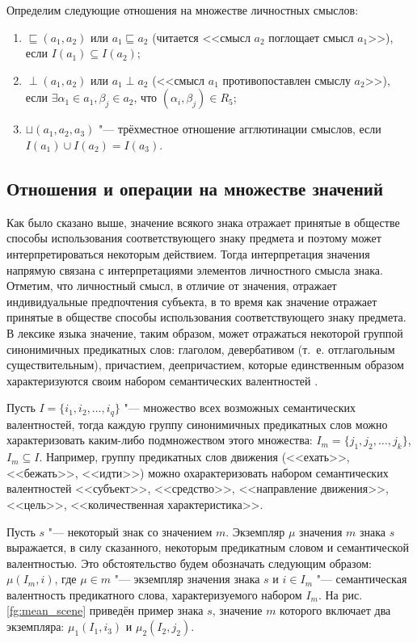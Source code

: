 Определим следующие отношения на множестве личностных смыслов:
\begin{enumerate}
	\item $\sqsubseteq(a_1,a_2)$ или $a_1\sqsubseteq a_2$ (читается <<смысл $a_2$ поглощает смысл $a_1$>>), если $I(a_1)\subseteq I(a_2)$;
	\item $\perp(a_1,a_2)$  или $a_1\perp a_2$ (<<смысл $a_1$ противопоставлен смыслу $a_2$>>), если $\exists\alpha_1\in a_1,\beta_j\in a_2$, что $(\alpha_i,\beta_j)\in R_5$;
	\item $\sqcup(a_1,a_2,a_3)$ "--- трёхместное отношение агглютинации смыслов, если $I(a_1)\cup I(a_2)=I(a_3)$.
\end{enumerate}

\subsection{Отношения и операции на множестве значений}

Как было сказано выше, значение всякого знака отражает принятые в обществе способы использования соответствующего знаку предмета и поэтому может интерпретироваться некоторым действием. Тогда интерпретация значения напрямую связана с интерпретациями элементов личностного смысла знака. Отметим, что личностный смысл, в отличие от значения, отражает индивидуальные предпочтения субъекта, в то время как значение отражает принятые в обществе способы использования соответствующего знаку предмета. В лексике языка значение, таким образом, может отражаться некоторой группой синонимичных предикатных слов: глаголом, девербативом (т.~е. отглагольным существительным), причастием, деепричастием, которые единственным образом характеризуются своим набором семантических валентностей \cite{Schank1972}.

Пусть $I=\{i_1,i_2,\dots,i_q\}$ "--- множество всех возможных семантических валентностей, тогда каждую группу синонимичных предикатных слов можно характеризовать каким-либо подмножеством этого множества: $I_m=\{j_1,j_2,\dots,j_k\}$, $I_m\subseteq I$. Например, группу предикатных слов движения (<<ехать>>, <<бежать>>, <<идти>>) можно охарактеризовать набором семантических валентностей <<субъект>>, <<средство>>, <<направление движения>>, <<цель>>, <<количественная характеристика>>. 

Пусть $s$ "--- некоторый знак со значением $m$. Экземпляр $\mu$ значения $m$ знака $s$ выражается, в силу сказанного, некоторым предикатным словом и семантической валентностью. Это обстоятельство будем обозначать следующим образом: $\mu(I_m,i)$, где $\mu\in m$ "--- экземпляр значения знака $s$ и $i\in I_m$ "--- семантическая валентность предикатного слова, характеризуемого набором $I_m$. На рис. \ref{fg:mean_scene} приведён пример знака $s$, значение $m$ которого включает два экземпляра: $\mu_1(I_1,i_3)$ и $\mu_2(I_2,j_2)$.

